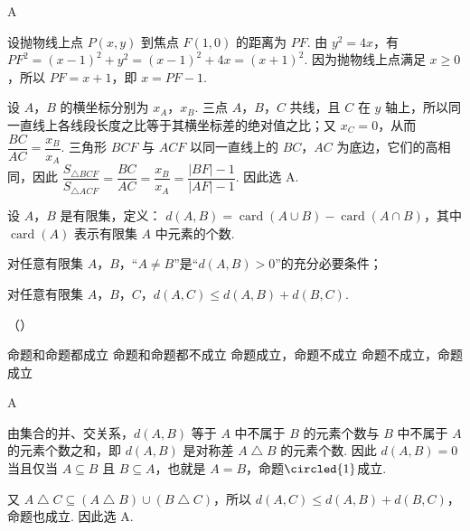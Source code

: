\begin{answer}
A
\end{answer}

\begin{solution}
设抛物线上点 \(P(x,y)\) 到焦点 \(F(1,0)\) 的距离为 \(PF\). 由 \(y^2=4x\)，有
\(PF^2=(x-1)^2+y^2=(x-1)^2+4x=(x+1)^2\). 因为抛物线上点满足 \(x\geqslant0\)，所以 \(PF=x+1\)，即
\(x=PF-1\).

设 \(A\)，\(B\) 的横坐标分别为 \(x_A\)，\(x_B\). 三点 \(A\)，\(B\)，\(C\) 共线，且 \(C\) 在 \(y\) 轴上，所以同一直线上各线段长度之比等于其横坐标差的绝对值之比；又 \(x_C=0\)，从而
\(\dfrac{BC}{AC}=\dfrac{x_B}{x_A}\). 三角形 \(BCF\) 与 \(ACF\) 以同一直线上的 \(BC\)，\(AC\) 为底边，它们的高相同，因此
\(\dfrac{S_{\triangle BCF}}{S_{\triangle ACF}}=\dfrac{BC}{AC}=\dfrac{x_B}{x_A}=\dfrac{|BF|-1}{|AF|-1}\). 因此选 A.
\end{solution}

\begin{problem}
设 \(A\)，\(B\) 是有限集，定义： \(d(A, B) = \operatorname{card}(A \cup B) - \operatorname{card}(A \cap B)\)，其中 \(\operatorname{card}(A)\) 表示有限集 \(A\) 中元素的个数.

\begin{circlelist}
\item 对任意有限集 \(A\)，\(B\)，“\(A \neq B\)”是“\(d(A, B) > 0\)”的充分必要条件；

\item 对任意有限集 \(A\)，\(B\)，\(C\)，\(d(A, C) \le d(A, B) + d(B, C)\).
\end{circlelist}

（\quad）

\choices
    {命题和命题都成立}
    {命题和命题都不成立}
    {命题成立，命题不成立}
    {命题不成立，命题成立}
\end{problem}

\begin{answer}
A
\end{answer}

\begin{solution}
由集合的并、交关系，\(d(A,B)\) 等于 \(A\) 中不属于 \(B\) 的元素个数与 \(B\) 中不属于 \(A\) 的元素个数之和，即 \(d(A,B)\) 是对称差 \(A\mathbin{\triangle}B\) 的元素个数. 因此 \(d(A,B)=0\) 当且仅当 \(A\subseteq B\) 且 \(B\subseteq A\)，也就是 \(A=B\)，命题\(\circled{1}\)成立.

又 \(A\mathbin{\triangle}C\subseteq(A\mathbin{\triangle}B)\cup(B\mathbin{\triangle}C)\)，所以
\(d(A,C)\leqslant d(A,B)+d(B,C)\)，命题也成立. 因此选 A.
\end{solution}

